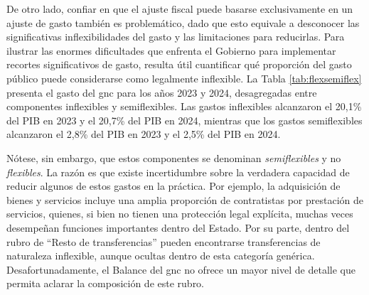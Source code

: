 %



De otro lado, confiar en que el ajuste fiscal puede basarse exclusivamente en un ajuste de gasto también es problemático, dado que esto equivale a desconocer las significativas inflexibilidades del gasto y las limitaciones para reducirlas. Para ilustrar las enormes dificultades que enfrenta el Gobierno para implementar recortes significativos de gasto, resulta útil cuantificar qué proporción del gasto público puede considerarse como legalmente inflexible. La Tabla \ref{tab:flexsemiflex} presenta el gasto del \gls{gnc} para los años 2023 y 2024, desagregadas entre componentes inflexibles y semiflexibles. Las gastos inflexibles alcanzaron el 20,1\% del PIB en 2023 y el 20,7\% del PIB en 2024, mientras que los gastos semiflexibles alcanzaron el 2,8\% del PIB en 2023 y el 2,5\% del PIB en 2024. 

Nótese, sin embargo, que estos componentes se denominan \textit{semiflexibles} y no \textit{flexibles}. La razón es que existe incertidumbre sobre la verdadera capacidad de reducir algunos de estos gastos en la práctica. Por ejemplo, la adquisición de bienes y servicios incluye una amplia proporción de contratistas por prestación de servicios, quienes, si bien no tienen una protección legal explícita, muchas veces desempeñan funciones importantes dentro del Estado. Por su parte, dentro del rubro de ``Resto de transferencias'' pueden encontrarse transferencias de naturaleza inflexible, aunque ocultas dentro de esta categoría genérica. Desafortunadamente, el Balance del \gls{gnc} no ofrece un mayor nivel de detalle que permita aclarar la composición de este rubro.

